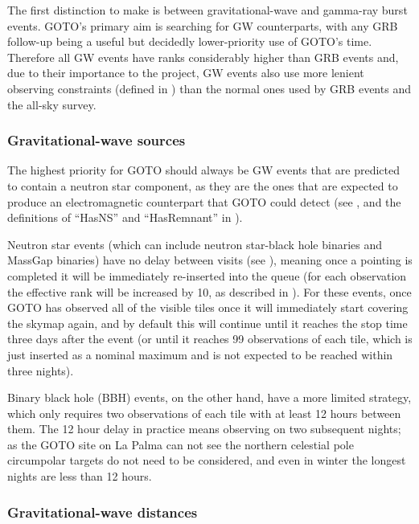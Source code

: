\begin{colsection}
The first distinction to make is between gravitational-wave and gamma-ray burst events. GOTO's primary aim is searching for GW counterparts, with any GRB follow-up being a useful but decidedly lower-priority use of GOTO's time. Therefore all GW events have ranks considerably higher than GRB events and, due to their importance to the project, GW events also use more lenient observing constraints (defined in ) than the normal ones used by GRB events and the all-sky survey.

\subsubsection{Gravitational-wave sources}

The highest priority for GOTO should always be GW events that are predicted to contain a neutron star component, as they are the ones that are expected to produce an electromagnetic counterpart that GOTO could detect (see , and the definitions of ``HasNS'' and ``HasRemnant'' in ).

Neutron star events (which can include neutron star-black hole binaries and MassGap binaries) have no delay between visits (see ), meaning once a pointing is completed it will be immediately re-inserted into the queue (for each observation the effective rank will be increased by 10, as described in ). For these events, once GOTO has observed all of the visible tiles once it will immediately start covering the skymap again, and by default this will continue until it reaches the stop time three days after the event (or until it reaches 99 observations of each tile, which is just inserted as a nominal maximum and is not expected to be reached within three nights).

Binary black hole (BBH) events, on the other hand, have a more limited  strategy, which only requires two observations of each tile with at least 12 hours between them. The 12 hour delay in practice means observing on two subsequent nights; as the GOTO site on La Palma can not see the northern celestial pole circumpolar targets do not need to be considered, and even in winter the longest nights are less than 12 hours.

\subsubsection{Gravitational-wave distances}


\end{colsection}

